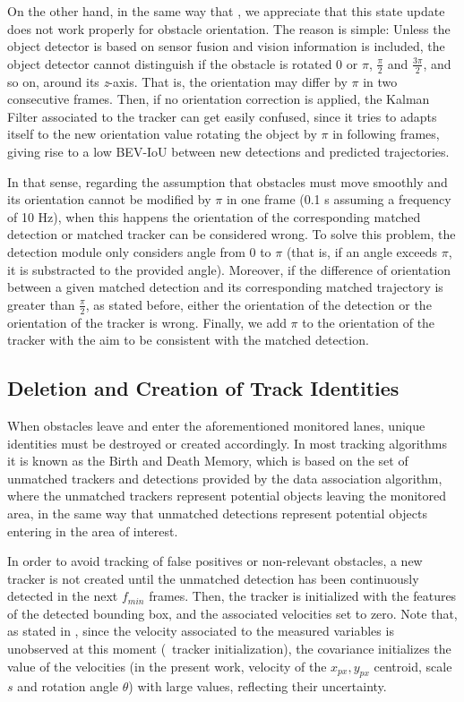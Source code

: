 On the other hand, in the same way that \cite{weng20203d}, we appreciate that this state update does not work properly for obstacle orientation. The reason is simple: Unless the object detector is based on sensor fusion and vision information is included, the object detector cannot distinguish if the obstacle is rotated 0 or $\pi$, $\frac{\pi}{2}$ and $\frac{3\pi}{2}$, and so on, around its \textit{z}-axis. That is, the orientation may differ by $\pi$ in two consecutive frames. Then, if no orientation correction is applied, the Kalman Filter associated to the tracker can get easily confused, since it tries to adapts itself to the new orientation value rotating the object by $\pi$ in following frames, giving rise to a low BEV-IoU between new detections and predicted trajectories. 

In that sense, regarding the assumption that obstacles must move smoothly and its orientation cannot be modified by $\pi$ in one frame (0.1 s assuming a frequency of 10 Hz), when this happens the orientation of the corresponding matched detection or matched tracker can be considered wrong. To solve this problem, the detection module only considers angle from 0 to $\pi$ (that is, if an angle exceeds $\pi$, it is substracted to the provided angle). Moreover, if the difference of orientation between a given matched detection and its corresponding matched trajectory is greater than $\frac{\pi}{2}$, as stated before, either the orientation of the detection or the orientation of the tracker is wrong. Finally, we add $\pi$ to the orientation of the tracker with the aim to be consistent with the matched detection. 

\subsection{Deletion and Creation of Track Identities}
\label{subsec:4_smartmot_data_deletion_creation}

When obstacles leave and enter the aforementioned monitored lanes, unique identities must be destroyed or created accordingly. In most tracking algorithms it is known as the Birth and Death Memory, which is based on the set of unmatched trackers and detections provided by the data association algorithm, where the unmatched trackers represent potential objects leaving the monitored area, in the same way that unmatched detections represent potential objects entering in the area of interest. 

In order to avoid tracking of false positives or non-relevant obstacles, a new tracker is not created until the unmatched detection has been continuously detected in the next $f_{min}$ frames. Then, the tracker is initialized with the features of the detected bounding box, and the associated velocities set to zero. Note that, as stated in \cite{bewley2016simple}, since the velocity associated to the measured variables is unobserved at this moment (\ie \, tracker initialization), the covariance initializes the value of the velocities (in the present work, velocity of the $x_{px},y_{px}$ centroid, scale $s$ and rotation angle $\theta$) with large values, reflecting their uncertainty. 

